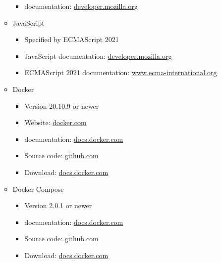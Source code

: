 \documentclass{scrreprt}
\begin{document}
\begin{itemize}
\begin{itemize}
\begin{itemize}
            \item \Gls{documentation}: \href{https://developer.mozilla.org/en-US/docs/Web/CSS}{developer.mozilla.org}
        
        \end{itemize}

        \item \gls{JavaScript}
        \begin{itemize}

            \item Specified by \gls{ECMAScript} 2021
            \item \gls{JavaScript} \gls{documentation}: \href{https://developer.mozilla.org/en-US/docs/Web/JavaScript}{developer.mozilla.org}
            \item \gls{ECMAScript} 2021 \gls{documentation}: \href{https://www.ecma-international.org/wp-content/uploads/ECMA-262_12th_edition_june_2021.pdf}{www.ecma-international.org}

        \end{itemize}
        
        \item \gls{Docker}
        \begin{itemize}
        
            \item Version 20.10.9 or newer
            \item Website: \href{https://www.docker.com/}{docker.com}
            \item \Gls{documentation}: \href{https://docs.docker.com/get-started/overview/}{docs.docker.com}
            \item Source code: \href{https://github.com/moby/moby}{github.com}
            \item Download: \href{https://docs.docker.com/get-docker/}{docs.docker.com}
        
        \end{itemize}
        
        \item \gls{Docker Compose}
        \begin{itemize}
        
            \item Version 2.0.1 or newer
            \item \Gls{documentation}: \href{https://docs.docker.com/compose/}{docs.docker.com}
            \item Source code: \href{https://github.com/docker/compose}{github.com}
            \item Download: \href{https://docs.docker.com/compose/install/}{docs.docker.com}
        

\end{itemize}
\end{itemize}
\end{itemize}
\end{document}
